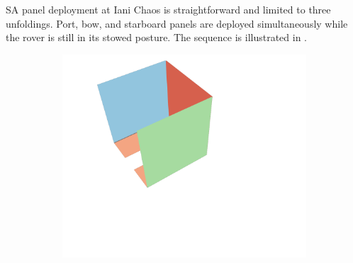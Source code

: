 \ac{SA} panel deployment at Iani Chaos is straightforward and limited to three unfoldings. Port, bow, and starboard panels are deployed simultaneously while the rover is still in its stowed posture. The sequence is illustrated in .

\vspace{0.5cm}

\begin{figure}[h]
\captionsetup[subfigure]{justification=centering}
\vspace{-2ex}
	\centering
    \setlength{\subfigureWidth}{0.32\textwidth}
    \setlength{\graphicsHeight}{30mm}
    \hypersetup{hidelinks=true}%
	\begin{subfigure}[t]{\subfigureWidth}
        \centering
		\includegraphics[height=\graphicsHeight]{sections/design/solar-array/images/deployment/iani-chaos/solar_array_deployment_iani_chaos_000.png}
		\label{fig:sub:deployment-sequence-iani-chaos-stowed}
	\end{subfigure}\hfill
	\begin{subfigure}[t]{\subfigureWidth}
        \centering

\end{subfigure}
\end{figure}
